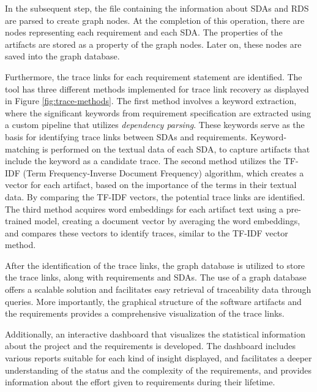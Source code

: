 In the subsequent step, the file containing the information about SDAs and RDS are parsed to create graph nodes. At the completion of this operation, there are nodes representing each requirement and each SDA. The properties of the artifacts are stored as a property of the graph nodes. Later on, these nodes are saved into the graph database.

Furthermore, the trace links for each requirement statement are identified. The tool has three different methods implemented for trace link recovery as displayed in Figure \ref{fig:trace-methods}. The first method involves a keyword extraction, where the significant keywords from requirement specification are extracted using a custom pipeline that utilizes \textit{dependency parsing}. These keywords serve as the basis for identifying trace links between SDAs and requirements. Keyword-matching is performed on the textual data of each SDA, to capture artifacts that include the keyword as a candidate trace. The second method utilizes the TF-IDF (Term Frequency-Inverse Document Frequency) algorithm, which creates a vector for each artifact, based on the importance of the terms in their textual data. By comparing the TF-IDF vectors, the potential trace links are identified. The third method acquires word embeddings for each artifact text using a pre-trained model, creating a document vector by averaging the word embeddings, and compares these vectors to identify traces, similar to the TF-IDF vector method. 

After the identification of the trace links, the graph database is utilized to store the trace links, along with requirements and SDAs. The use of a graph database offers a scalable solution and facilitates easy retrieval of traceability data through queries. More importantly, the graphical structure of the software artifacts and the requirements provides a comprehensive visualization of the trace links.

Additionally, an interactive dashboard that visualizes the statistical information about the project and the requirements is developed. The dashboard includes various reports suitable for each kind of insight displayed, and facilitates a deeper understanding of the status and the complexity of the requirements, and provides information about the effort given to requirements during their lifetime.

